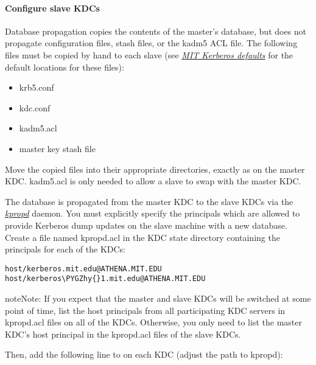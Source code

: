 \documentclass[letterpaper,10pt,english]{sphinxmanual}
\def\PYGZhy{\char`\-}
\begin{document}
\paragraph{Configure slave KDCs}
\label{admin/install_kdc:configure-slave-kdcs}
Database propagation copies the contents of the master's database, but
does not propagate configuration files, stash files, or the kadm5 ACL
file.  The following files must be copied by hand to each slave (see
{\hyperref[mitK5defaults:mitk5defaults]{\emph{MIT Kerberos defaults}}} for the default locations for these files):
\begin{itemize}
\item {} 
krb5.conf

\item {} 
kdc.conf

\item {} 
kadm5.acl

\item {} 
master key stash file

\end{itemize}

Move the copied files into their appropriate directories, exactly as
on the master KDC.  kadm5.acl is only needed to allow a slave to swap
with the master KDC.

The database is propagated from the master KDC to the slave KDCs via
the {\hyperref[admin/admin_commands/kpropd:kpropd-8]{\emph{kpropd}}} daemon.  You must explicitly specify the
principals which are allowed to provide Kerberos dump updates on the
slave machine with a new database.  Create a file named kpropd.acl in
the KDC state directory containing the  principals for each of
the KDCs:

\begin{Verbatim}[commandchars=\\\{\}]
host/kerberos.mit.edu@ATHENA.MIT.EDU
host/kerberos\PYGZhy{}1.mit.edu@ATHENA.MIT.EDU
\end{Verbatim}

\begin{notice}{note}{Note:}
If you expect that the master and slave KDCs will be
switched at some point of time, list the host principals
from all participating KDC servers in kpropd.acl files on
all of the KDCs.  Otherwise, you only need to list the
master KDC's host principal in the kpropd.acl files of the
slave KDCs.
\end{notice}

Then, add the following line to  on each KDC
(adjust the path to kpropd):
\end{document}
